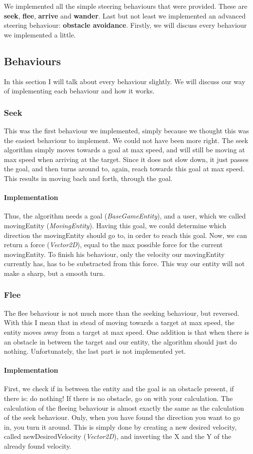 We implemented all the simple steering behaviours that were provided.
These are \textbf{seek}, \textbf{flee}, \textbf{arrive} and \textbf{wander}.
Last but not least we implemented an advanced steering behaviour: \textbf{obstacle avoidance}.
Firstly, we will discuss every behaviour we implemented a little.
\subsection[Describing the steering behaviours]{Behaviours}\label{subsec:behaviours}
In this section I will talk about every behaviour slightly.
We will discuss our way of implementing each behaviour and how it works.
\subsubsection{Seek}
This was the first behaviour we implemented, simply because we thought this was the easiest behaviour to implement.
We could not have been more right.
The seek algorithm simply moves towards a goal at max speed, and will still be moving at max speed when arriving at the target.
Since it does not slow down, it just passes the goal, and then turns around to, again, reach towards this goal at max speed.
This results in moving bach and forth, through the goal.
\paragraph{Implementation}
Thus, the algorithm needs a goal (\textit{BaseGameEntity}), and a user, which we called movingEntity (\textit{MovingEntity}).
Having this goal, we could determine which direction the movingEntity should go to, in order to reach this goal.
Now, we can return a force (\textit{Vector2D}), equal to the max possible force for the current movingEntity.
To finish his behaviour, only the velocity our movingEntity currently has, has to be substracted from this force.
This way our entity will not make a sharp, but a smooth turn.
\subsubsection{Flee}
The flee behaviour is not much more than the seeking behaviour, but reversed.
With this I mean that in stead of moving towards a target at max speed, the entity moves away from a target at max speed.
One addition is that when there is an obstacle in between the target and our entity, the algorithm should just do nothing.
Unfortunately, the last part is not implemented yet.
\paragraph{Implementation}
First, we check if in between the entity and the goal is an obstacle present, if there is: do nothing!
If there is no obstacle, go on with your calculation.
The calculation of the fleeing behaviour is almost exactly the same as the calculation of the seek behaviour.
Only, when you have found the direction you want to go in, you turn it around.
This is simply done by creating a new desired velocity, called newDesiredVelocity (\textit{Vector2D}), and inverting the X and the Y of the already found velocity.
